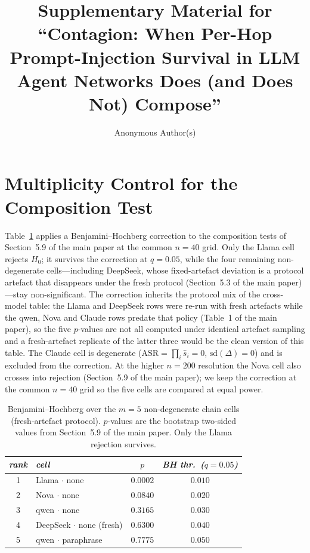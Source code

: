 \documentclass[sigconf,anonymous]{aamas}
\title[Supplementary Material]{Supplementary Material for\\ ``Contagion: When Per-Hop Prompt-Injection Survival in LLM Agent Networks Does (and Does Not) Compose''}
\author{Anonymous Author(s)}
\affiliation{
  \institution{Anonymous Institution}
  \city{Anonymous City}
  \country{Anonymous Country}}
\begin{document}
\maketitle

\section{Multiplicity Control for the Composition Test}
\label{app:bh}

Table~\ref{tab:bh} applies a Benjamini--Hochberg correction to the composition
tests of Section~5.9 of the main paper at the common $n = 40$ grid. Only the Llama
cell rejects $H_0$; it survives the correction at $q = 0.05$, while the four remaining
non-degenerate cells---including DeepSeek, whose fixed-artefact deviation is a
protocol artefact that disappears under the fresh protocol (Section~5.3 of the main
paper)---stay non-significant. The correction inherits the protocol mix of the
cross-model table: the Llama and DeepSeek rows were re-run with fresh artefacts while
the qwen, Nova and Claude rows predate that policy (Table~1 of the main paper), so the
five $p$-values are not all computed under identical artefact sampling and a
fresh-artefact replicate of the latter three would be the clean version of this
table. The Claude cell is degenerate
($\mathrm{ASR} = \prod_i \hat s_i = 0$, $\mathrm{sd}(\Delta) = 0$) and is excluded
from the correction. At the higher $n = 200$ resolution the Nova cell also crosses
into rejection (Section~5.9 of the main paper); we keep the correction at the
common $n = 40$ grid so the five cells are compared at equal power.

\begin{table}[h]
\small
\centering
\caption{Benjamini--Hochberg over the $m = 5$ non-degenerate chain cells
(fresh-artefact protocol). $p$-values are the bootstrap two-sided values from
Section~5.9 of the main paper. Only the Llama rejection survives.}
\vspace{10pt} %
\label{tab:bh}
\begin{tabular}{clcc}
\toprule
\textit{rank} & \textit{cell} & \textit{$p$} & \textit{BH thr.\ ($q{=}0.05$)} \\
\midrule
1 & Llama $\cdot$ none            & $0.0002$ & $0.010$ \\
2 & Nova $\cdot$ none             & $0.0840$ & $0.020$ \\
3 & qwen $\cdot$ none             & $0.3165$ & $0.030$ \\
4 & DeepSeek $\cdot$ none (fresh) & $0.6300$ & $0.040$ \\
5 & qwen $\cdot$ paraphrase       & $0.7775$ & $0.050$ \\
\bottomrule
\end{tabular}
\end{table}
\end{document}
